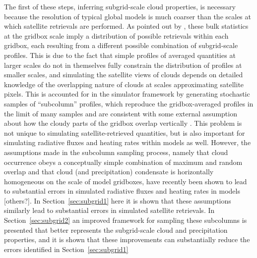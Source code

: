 The first of these steps, inferring subgrid-scale cloud properties, is
necessary because the resolution of typical global models is much
coarser than the scales at which satellite retrievals are performed. As
pointed out by \citet{pincus_et_al_2012}, these bulk statistics at the
gridbox scale imply a distribution of possible retrievals within each
gridbox, each resulting from a different possible combination of
subgrid-scale profiles. This is due to the fact that simple profiles of
averaged quantities at larger scales do not in themselves fully
constrain the distribution of profiles at smaller scales, and simulating
the satellite views of clouds depends on detailed knowledge of the
overlapping nature of clouds at scales approximating satellite pixels.
This is accounted for in the simulator framework by generating
stochastic samples of ``subcolumn'' profiles, which reproduce the
gridbox-averaged profiles in the limit of many samples and are
consistent with some external assumption about how the cloudy parts of
the gridbox overlap vertically \citep{klein_and_jakob_1999}. This
problem is not unique to simulating satellite-retrieved quantities, but
is also important for simulating radiative fluxes and heating rates
within models as well. However, the assumptions made in the subcolumn
sampling process, namely that cloud occurrence obeys a conceptually
simple combination of maximum and random overlap and that cloud (and
precipitation) condensate is horizontally homogeneous on the scale of
model gridboxes, have recently been shown to lead to substantial errors
in simulated radiative fluxes and heating rates in models
\citep{barker_et_al_1999, oreopoulos_et_al_2012} {[}others?{]}. In
Section~\ref{sec:subgrid1} here it is shown that these assumptions
similarly lead to substantial errors in simulated satellite retrievals.
In Section~\ref{sec:subgrid2} an improved framework for sampling these
subcolumns is presented that better represents the subgrid-scale cloud
and precipitation properties, and it is shown that these improvements
can substantially reduce the errors identified in
Section~\ref{sec:subgrid1}

